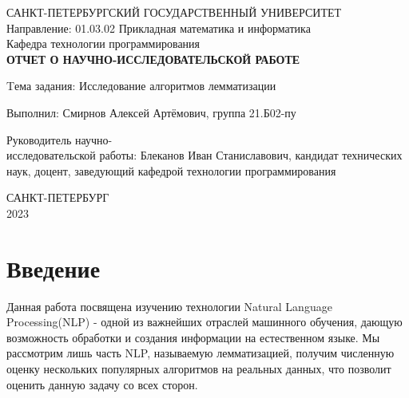 \documentclass[12pt, a4paper]{article}
\begin{document}
\pagestyle{fancy}
\fancyhf{}
\renewcommand{\headrulewidth}{0pt}

\begin{center}
САНКТ-ПЕТЕРБУРГСКИЙ ГОСУДАРСТВЕННЫЙ УНИВЕРСИТЕТ\\
Направление: 01.03.02 Прикладная математика и информатика \\
Кафедра технологии программирования \\

\vspace*{2cm}
\large \textbf{ОТЧЕТ О НАУЧНО-ИССЛЕДОВАТЕЛЬСКОЙ РАБОТЕ}
\end{center}
\vspace*{2cm}

\hspace*{0.5cm}
Tема задания: Исследование алгоритмов лемматизации
\vspace*{1cm}

\hspace*{0.5cm}
Выполнил: Смирнов Алексей Артёмович, группа 21.Б02-пу 
\vspace*{1cm}

\hspace*{0.5cm}
Руководитель научно- \\
\hspace*{1cm} исследовательской работы: Блеканов Иван Станиславович, кандидат технических \\\hspace*{1cm} наук, доцент, заведующий кафедрой технологии программирования
 
 
\vspace*{10cm}
\begin{center}
САНКТ-ПЕТЕРБУРГ \\
2023
\end{center}

\newpage

\renewcommand{\contentsname}{\begin{center}Содержание\end{center}}
\tableofcontents

\newpage

\fancyfoot[C]{\thepage}

\section{Введение}
\quad Данная работа посвящена изучению технологии Natural Language Processing(NLP) - одной из важнейших отраслей машинного обучения, дающую возможность обработки и создания информации на естественном языке. Мы рассмотрим лишь часть NLP, называемую лемматизацией, получим численную оценку нескольких популярных алгоритмов на реальных данных, что позволит оценить данную задачу со всех сторон.
\end{document}
